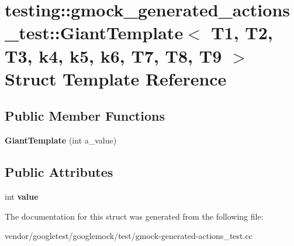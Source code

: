 \hypertarget{structtesting_1_1gmock__generated__actions__test_1_1_giant_template}{}\section{testing\+:\+:gmock\+\_\+generated\+\_\+actions\+\_\+test\+:\+:Giant\+Template$<$ T1, T2, T3, k4, k5, k6, T7, T8, T9 $>$ Struct Template Reference}
\label{structtesting_1_1gmock__generated__actions__test_1_1_giant_template}
\subsection*{Public Member Functions}
\begin{DoxyCompactItemize}
\item 
\mbox{\label{structtesting_1_1gmock__generated__actions__test_1_1_giant_template_aaa836b162de31fbd538ffcbed448f430}} 
{\bfseries Giant\+Template} (int a\+\_\+value)
\end{DoxyCompactItemize}
\subsection*{Public Attributes}
\begin{DoxyCompactItemize}
\item 
\mbox{\label{structtesting_1_1gmock__generated__actions__test_1_1_giant_template_afa0f7a8e5ac8c8b7c59d60ad66980856}} 
int {\bfseries value}
\end{DoxyCompactItemize}


The documentation for this struct was generated from the following file\+:\begin{DoxyCompactItemize}
\item 
vendor/googletest/googlemock/test/gmock-\/generated-\/actions\+\_\+test.\+cc\end{DoxyCompactItemize}

